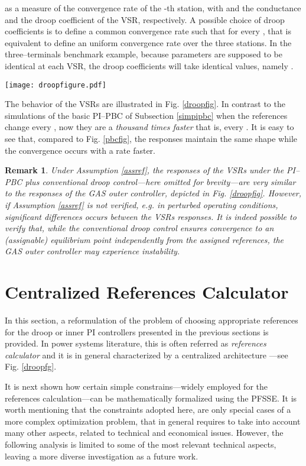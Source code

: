 \documentclass[5p,twocolumn]{elsarticle}
\def\begrem{\begin{remark}\rm}
\def\endrem{\end{remark}}
\newtheorem{remark}[theorem]{Remark}
\numberwithin{equation}{section}
\begin{document}
as a measure of the convergence rate of the -th station, with  and  the conductance and the droop coefficient of the VSR, respectively. A possible choice of droop coefficients is to define a common convergence rate  such that  for every , that is equivalent to define an uniform convergence rate over the three stations. In the three--terminals benchmark example, because parameters are supposed to be identical at each VSR, the droop coefficients will take identical values, namely .
\begin{figure*}[ht]
 \centering
 \texttt{[image: droopfigure.pdf]}
\caption{{Responses of VSRs variables with the decentralized PI--PBC plus GAS outer controller.}}
 \label{droopfig}
\end{figure*}
The behavior of the VSRs are illustrated in Fig. \ref{droopfig}. In contrast to the simulations of the basic PI--PBC of Subsection \ref{simpipbc} when the references change every , now they are a {\em thousand times faster} that is, every  . It is easy to see that, compared to Fig. \ref{pbcfig}, the responses maintain the same shape while the convergence occurs with a rate  faster.


\begrem
Under Assumption \ref{assref}, the responses of the VSRs under the PI--PBC plus conventional droop control---here omitted for brevity---are very similar to the responses of the GAS outer controller, depicted in Fig. \ref{droopfig}. However, if Assumption \ref{assref} is not verified, \textit{e.g.} in perturbed operating conditions, significant differences occurs between the VSRs responses. It is indeed possible to verify that, while the conventional droop control ensures convergence to an (assignable) equilibrium point independently from the assigned references, the GAS outer controller may experience instability.
\endrem



\section{Centralized References Calculator}
\label{sec7}
In this section, a reformulation of the problem of choosing appropriate references for the droop or inner PI controllers presented in the previous sections is provided. In power systems literature, this is
often referred as \textit{references calculator}  \cite{berteen}  and it is in general characterized by a centralized architecture ---see Fig. \ref{droopfg}. 

It is next shown how certain simple constrains---widely employed for the references calculation---can be mathematically formalized using the PFSSE. It is worth mentioning that the constraints adopted here, are only special cases of a more complex optimization problem, that in general requires to take into account many other aspects, related to technical and economical issues. However, the following analysis is limited to some of the most relevant technical aspects, leaving a more diverse investigation as a future work.
\end{document}
